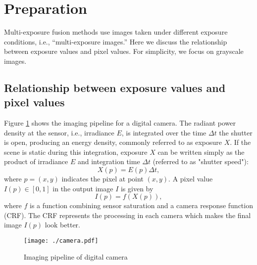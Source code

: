 \documentclass[paper]{ieice}
\begin{document}
\section{Preparation}
  Multi-exposure fusion methods use images taken under different exposure conditions,
  i.e., “multi-exposure images.”
  Here we discuss the relationship between exposure values and pixel values.
  For simplicity, we focus on grayscale images.

\subsection{Relationship between exposure values and pixel values}
  Figure \ref{fig:camera} shows the imaging pipeline for a digital camera\cite{dufaux2016high}.
  The radiant power density at the sensor, i.e., irradiance $E$,
  is integrated over the time $\Delta t$ the shutter is open, producing an energy density,
  commonly referred to as exposure $X$.
  If the scene is static during this integration,
  exposure $X$ can be written simply as the product of irradiance $E$
  and integration time $\Delta t$ (referred to as "shutter speed"):
  \begin{equation}
    X(p) = E(p)\Delta t ,
    \label{eq:exposure}
  \end{equation}
  where $p=(x,y)$ indicates the pixel at point $(x,y)$.
  A pixel value $I(p) \in [0, 1]$ in the output image $I$ is given by
  \begin{equation}
    I(p) = f(X(p)) ,
    \label{eq:CRF}
  \end{equation}
  where $f$ is a function combining sensor saturation and a camera response function (CRF).
  The CRF represents the processing in each camera which makes
  the final image $I(p)$ look better.

  \begin{figure}[!t]
    \centering
    \texttt{[image: ./camera.pdf]}
    \caption{Imaging pipeline of digital camera} \label{fig:camera} 
  \end{figure}
  
\end{document}
